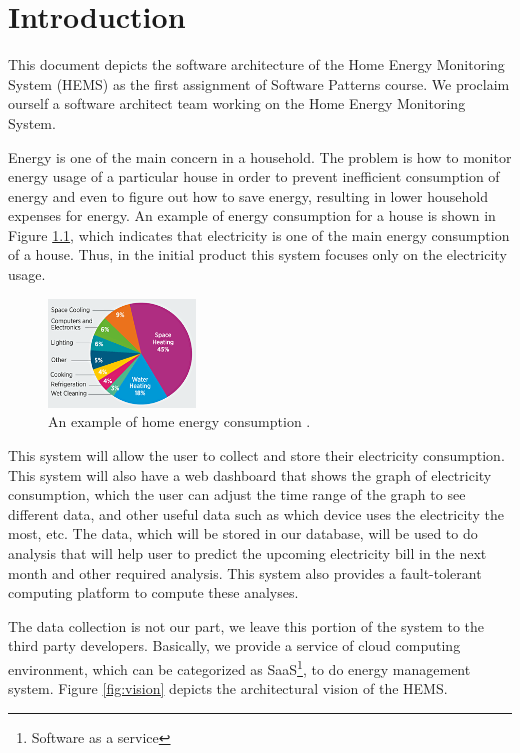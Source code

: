 \chapter{Introduction}
\label{ch:context}
This document depicts the software architecture of the Home Energy Monitoring System (HEMS) as the first assignment of Software Patterns course. We proclaim ourself a software architect team working on the Home Energy Monitoring System.

Energy is one of the main concern in a household. The problem is how to monitor energy usage of a particular house in order to prevent inefficient consumption of energy and even to figure out how to save energy, resulting in lower household expenses for energy. An example of energy consumption for a house is shown in Figure \ref{fig:home-energy-consumption}, which indicates that electricity is one of the main energy consumption of a house. Thus, in the initial product this system focuses only on the electricity usage.

\begin{figure}[!ht]
	\centering
	\includegraphics[width=0.35\textwidth]{1-context/images/energysaver_energyuse.png}
	\caption{An example of home energy consumption \cite{greenifynow}.}
	\label{fig:home-energy-consumption}
\end{figure}

This system will allow the user to collect and store their electricity consumption. This system will also have a web dashboard that shows the graph of electricity consumption, which the user can adjust the time range of the graph to see different data, and other useful data such as which device uses the electricity the most, etc. The data, which will be stored in our database, will be used to do analysis that will help user to predict the upcoming electricity bill in the next month and other required analysis. This system also provides a fault-tolerant computing platform to compute these analyses.

The data collection is not our part, we leave this portion of the system to the third party developers. Basically, we provide a service of cloud computing environment, which can be categorized as SaaS\footnote{Software as a service}, to do energy management system. Figure \ref{fig:vision} depicts the architectural vision of the HEMS.

